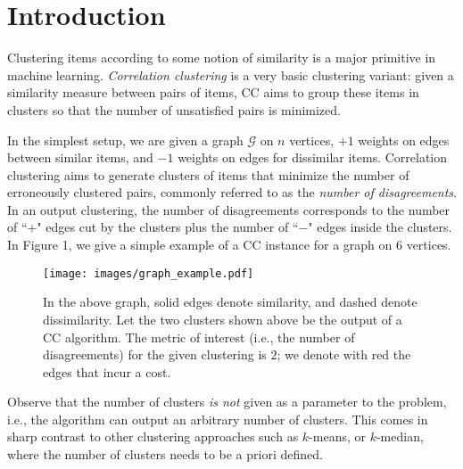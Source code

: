 \documentclass{article} %
\begin{document}
\section{Introduction}

%
Clustering items according to some notion of similarity is a major primitive in machine learning.
{\it Correlation clustering} is a very basic clustering variant: given a similarity measure between pairs of items, CC aims to group these items in clusters so that the number of unsatisfied pairs is minimized.

In the simplest setup, we are given a graph $\mathcal{G}$ on $n$ vertices, $+1$ weights on edges between similar items, and $-1$ weights on edges for dissimilar items. 
Correlation clustering aims to generate clusters of items that minimize the number of erroneously clustered pairs, commonly referred to as the {\it number of disagreements}.
In an output clustering, the number of disagreements corresponds to the number of ``$+$" edges cut by the clusters plus the number of ``$-$" edges inside the clusters.
In Figure 1, we give a simple example of a CC instance for a graph on 6 vertices.
 \begin{figure}[h]
\centerline{ \texttt{[image: images/graph\_example.pdf]}}
\caption{In the above graph, solid edges denote similarity, and dashed denote dissimilarity.
Let the two clusters shown above be the output of a CC algorithm.
The metric of interest (i.e., the number of disagreements) for the given clustering is $2$; we denote with red the edges that incur a cost.}
\label{fig:graph_example}
\end{figure}     

Observe that the number of clusters {\it is not} given as a parameter to the problem, i.e., the algorithm can output an arbitrary number of clusters.
This comes in sharp contrast to other clustering approaches such as $k$-means, or $k$-median, where the number of clusters needs to be a priori defined.
\end{document}
